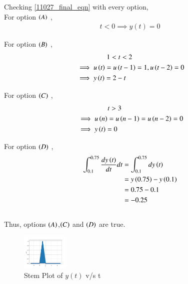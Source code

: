 \documentclass[journal,12pt,twocolumn]{IEEEtran}
\theoremstyle{remark}
\begin{document}
Checking \eqref{11027_final_eqn} with every option,\\
For option $\left(A\right)$ ,
\begin{align}
	t<0 \implies y(t) = 0
\end{align}

For option $\left(B\right)$ , 
\begin{align}
	&\;\;\;\;\;\;\;\;\;\;\;\;\;\;\;\;1<t<2\\ 
	&\implies u\left(t\right)=u\left(t-1\right) = 1, u\left(t-2\right)=0\\
	&\implies y\left(t\right) = 2-t
\end{align}

For option $\left(C\right)$ ,
\begin{align}
	&\;\;\;\;\;\;\;\;\;\;\;\;\;\;\;\;t>3
	\\ &\implies u\left(n\right)=u\left(n-1\right) = u\left(n-2\right) = 0\\
	&\implies y\left(t\right) = 0
\end{align}

For option $\left(D\right)$ ,
\begin{align}
    \int_{0.1} ^ {0.75} \frac{dy\left(t\right)}{dt} dt &= 
    \int_{0.1} ^ {0.75} dy\left(t\right) \\&= y\left(0.75\right) - y\left(0.1\right) \\
    &= 0.75 - 0.1\\
    &= -0.25
\end{align}
\\
Thus, options $\left(A\right)$,$\left(C\right)$ and $\left(D\right)$ are true.\\
\begin{figure}[h]
    \includegraphics[width=0.199\textwidth]{figs/y(t)_vs_t.png}
    \caption{Stem Plot of $y(t)$ v/s t}
\end{figure}
\end{document}
